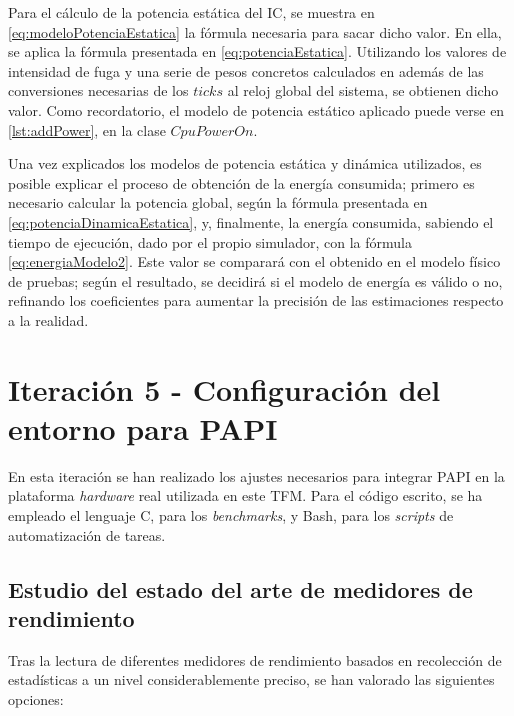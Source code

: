 Para el cálculo de la potencia estática del \ac{IC}, se muestra en \ref{eq:modeloPotenciaEstatica} la fórmula necesaria para sacar dicho valor. En ella, se aplica la fórmula presentada en \ref{eq:potenciaEstatica}.  Utilizando los valores de intensidad de fuga y una serie de pesos concretos calculados en \cite{soton393728} \cite{soton418538} además de las conversiones necesarias de los $ticks$ al reloj global del sistema, se obtienen dicho valor. Como recordatorio, el modelo de potencia estático aplicado puede verse en \ref{lst:addPower}, en la clase $CpuPowerOn$. 

Una vez explicados los modelos de potencia estática y dinámica utilizados, es posible explicar el proceso de obtención de la energía consumida; primero es necesario calcular la potencia global, según la fórmula presentada en \ref{eq:potenciaDinamicaEstatica}, y, finalmente, la energía consumida, sabiendo el tiempo de ejecución, dado por el propio simulador, con la fórmula \ref{eq:energiaModelo2}. Este valor se comparará con el obtenido en el modelo físico de pruebas; según el resultado, se decidirá si el modelo de energía es válido o no, refinando los coeficientes para aumentar la precisión de las estimaciones respecto a la realidad.


\section{Iteración 5 - Configuración del entorno para PAPI}

En esta iteración se han realizado los ajustes necesarios para integrar \ac{PAPI} en la plataforma \textit{hardware} real utilizada en este \ac{TFM}. Para el código escrito, se ha empleado el lenguaje C, para los \textit{benchmarks}, y Bash, para los \textit{scripts} de automatización de tareas.

\subsection{Estudio del estado del arte de medidores de rendimiento}

Tras la lectura de diferentes medidores de rendimiento basados en recolección de estadísticas a un nivel considerablemente preciso, se han valorado las siguientes opciones:


